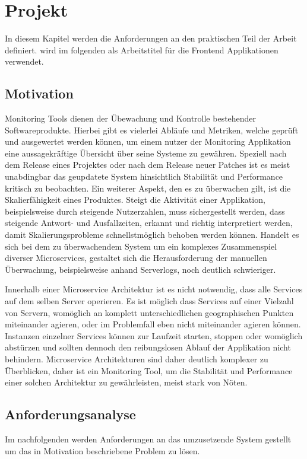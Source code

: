 
\chapter{Projekt \projectname}

In diesem Kapitel werden die Anforderungen an den praktischen Teil der Arbeit definiert.
\projectname wird im folgenden als Arbeitstitel für die Frontend Applikationen verwendet.

\section{Motivation}

Monitoring Tools dienen der Übewachung und Kontrolle bestehender Softwareprodukte.
Hierbei gibt es vielerlei Abläufe und Metriken, welche geprüft und ausgewertet werden können, um einem nutzer der Monitoring Applikation
eine aussagekräftige Übersicht über seine Systeme zu gewähren. Speziell nach dem Release eines Projektes oder nach dem Release neuer Patches
ist es meist unabdingbar das geupdatete System hinsichtlich Stabilität und Performance kritisch zu beobachten. Ein weiterer Aspekt, den es zu überwachen gilt,
ist die Skalierfähigkeit eines Produktes. Steigt die Aktivität einer Applikation, beispielsweise durch steigende Nutzerzahlen,
muss sichergestellt werden, dass steigende Antwort- und Ausfallzeiten, erkannt und richtig interpretiert werden, damit Skalierungsprobleme schnellstmöglich behoben werden können.
Handelt es sich bei dem zu überwachendem System um ein komplexes Zusammenspiel diverser Microservices, gestaltet sich die Herausforderung der manuellen Überwachung, beispielsweise anhand
Serverlogs, noch deutlich schwieriger.

Innerhalb einer Microservice Architektur ist es nicht notwendig, dass alle Services auf dem selben Server operieren.
Es ist möglich dass Services auf einer Vielzahl von Servern, womöglich an komplett unterschiedlichen geographischen Punkten miteinander agieren,
oder im Problemfall eben nicht miteinander agieren können. Instanzen einzelner Services können zur Laufzeit starten, stoppen oder womöglich abstürzen
und sollten dennoch den reibungslosen Ablauf der Applikation nicht behindern. Microservice Architekturen sind daher deutlich komplexer zu Überblicken,
daher ist ein Monitoring Tool, um die Stabilität und Performance einer solchen Architektur zu gewährleisten, meist stark von Nöten.


\section{Anforderungsanalyse}

Im nachfolgenden werden Anforderungen an das umzusetzende System gestellt um das in Motivation beschriebene Problem zu lösen.
